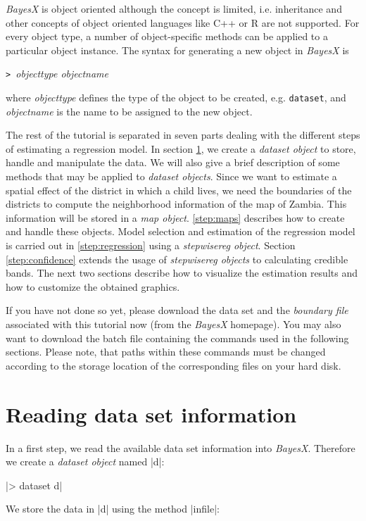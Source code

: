 {\it BayesX} is object oriented although the concept is limited, i.e. inheritance and other concepts of object oriented
languages like C++ or R are not supported. For every object type, a number of object-specific methods can be applied to a
particular object instance. The syntax for generating a new object in {\it BayesX} is

{\tt> }{\it objecttype objectname}

where {\it objecttype} defines the type of the object to be created, e.g. {\tt dataset}, and {\it objectname} is the name to be
assigned to the new object.

The rest of the tutorial is separated in seven parts dealing with the different steps of estimating a regression model. In
section \ref{step:datasets}, we create a {\it dataset object} to store, handle and manipulate the data. We will also give a
brief description of some methods that may be applied to {\it dataset objects}. Since we want to estimate a spatial effect of
the district in which a child lives, we need the boundaries of the districts to compute the neighborhood information of the map
of Zambia. This information will be stored in a {\it map object}. \ref{step:maps} describes how to create and handle these
objects. Model selection and estimation of the regression model is carried out in \ref{step:regression} using a {\it
stepwisereg object}. Section \ref{step:confidence} extends the usage of {\it stepwisereg objects} to calculating
credible bands. The next two sections describe how to visualize the estimation results and how to customize the obtained
graphics.

If you have not done so yet, please download the data set and the {\it boundary file} associated with this tutorial now (from
the {\it BayesX} homepage). You may also want to download the batch file containing the commands used in the following
sections. Please note, that paths within these commands must be changed according to the storage location of the corresponding
files on your hard disk.

\section{Reading data set information}\label{step:datasets}

In a first step, we read the available data set information into {\it BayesX}. Therefore we create a {\it dataset object} named
|d|:

|> dataset d|

We store the data in |d| using the method |infile|:

